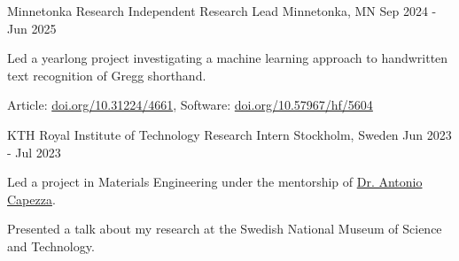 

\begin{cventries}

  \cventry
    {Minnetonka Research} %
    {Independent Research Lead} %
    {Minnetonka, MN} %
    {Sep 2024 - Jun 2025} %
    {
      \begin{cvitems} %
        \item {Led a yearlong project investigating a machine learning approach to handwritten text recognition of Gregg shorthand.}
        \item {Article: \href{https://doi.org/10.31224/4661}{doi.org/10.31224/4661}, Software: \href{https://doi.org/10.57967/hf/5604}{doi.org/10.57967/hf/5604}}
      \end{cvitems}
    }
  \cventry
    {KTH Royal Institute of Technology} %
    {Research Intern} %
    {Stockholm, Sweden} %
    {Jun 2023 - Jul 2023} %
    {
      \begin{cvitems} %
        \item {Led a project in Materials Engineering under the mentorship of  \href{https://www.kth.se/profile/ajcv}{Dr. Antonio Capezza}.}
        \item {Presented a talk about my research at the Swedish National Museum of Science and Technology.}
      \end{cvitems}
    }
\end{cventries}
